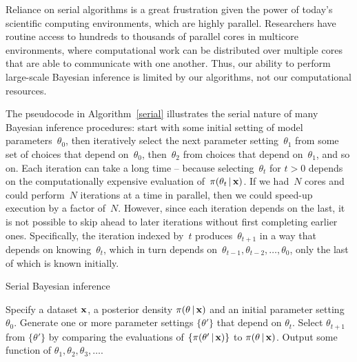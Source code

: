 \documentclass[angelino.tex]{subfiles}
\begin{document}
Reliance on serial algorithms is a great frustration given the power of today's
scientific computing environments, which are highly parallel.
Researchers have routine access to hundreds to thousands of parallel cores in
multicore environments, where computational work can be distributed over
multiple cores that are able to communicate with one another.
Thus, our ability to perform large-scale Bayesian inference is
limited by our algorithms, not our computational resources.

The pseudocode in Algorithm~\ref{serial} illustrates the serial nature of
many Bayesian inference procedures:
start with some initial setting of model parameters~$\theta_0$,
then iteratively select the next parameter setting~$\theta_1$ from some
set of choices that depend on~$\theta_0$, 
then~$\theta_2$ from choices that depend on~$\theta_1$, and so on.
Each iteration can take a long time --
\eg because selecting~$\theta_{t}$ for $t > 0$ depends on the
computationally expensive evaluation of~$\pi(\theta_t \,|\, \mathbf{x})$.
If we had~$N$ cores and could perform~$N$ iterations at a time in parallel,
then we could speed-up execution by a factor of~$N$.
However, since each iteration depends on the last, it is not possible to skip
ahead to later iterations without first completing earlier ones.
Specifically, the iteration indexed by~$t$ produces~$\theta_{t+1}$ in a way that 
depends on knowing~$\theta_t$, which in turn depends
on~${\theta_{t-1}, \theta_{t-2}, \dots, \theta_0}$,
only the last of which is known initially.

\begin{algorithm}[t]
\caption{Serial Bayesian inference}
\label{serial}
\begin{algorithmic}
\State Specify a dataset $\mathbf{x}$, a posterior density $\pi(\theta \,|\, \mathbf{x})$
and an initial parameter setting $\theta_0$.
\State Generate one or more parameter settings $\{\theta'\}$
that depend on $\theta_t$.
\State Select $\theta_{t+1}$ from $\{\theta'\}$ by comparing
the evaluations of $\{\pi(\theta' \,|\, \mathbf{x})\}$ to $\pi(\theta \,|\, \mathbf{x})$.
\EndFor
\State Output some function of $\theta_1, \theta_2, \theta_3, \dots$.
\end{algorithmic}
\end{algorithm}

\end{document}
